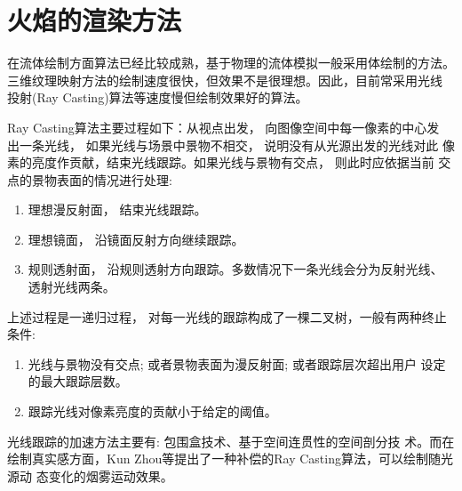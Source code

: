 \section{火焰的渲染方法}

在流体绘制方面算法已经比较成熟，基于物理的流体模拟一般采用体绘制的方法。
三维纹理映射方法的绘制速度很快，但效果不是很理想。因此，目前常采用光线
投射(Ray Casting)算法等速度慢但绘制效果好的算法。

Ray Casting算法主要过程如下：从视点出发， 向图像空间中每一像素的中心发
出一条光线， 如果光线与场景中景物不相交， 说明没有从光源出发的光线对此
像素的亮度作贡献，结束光线跟踪。如果光线与景物有交点， 则此时应依据当前
交点的景物表面的情况进行处理:
\begin{enumerate}
\item 理想漫反射面， 结束光线跟踪。
\item 理想镜面， 沿镜面反射方向继续跟踪。
\item 规则透射面， 沿规则透射方向跟踪。多数情况下一条光线会分为反射光线、
  透射光线两条。
\end{enumerate}
上述过程是一递归过程， 对每一光线的跟踪构成了一棵二叉树，一般有两种终止条件:
\begin{enumerate}
\item 光线与景物没有交点; 或者景物表面为漫反射面; 或者跟踪层次超出用户
  设定的最大跟踪层数。
\item 跟踪光线对像素亮度的贡献小于给定的阈值。
\end{enumerate}

光线跟踪的加速方法主要有: 包围盒技术、基于空间连贯性的空间剖分技
术\cite{review:Wangxiaohua}。而在绘制真实感方面，Kun
Zhou等\cite{Zhou:2008}提出了一种补偿的Ray Casting算法，可以绘制随光源动
态变化的烟雾运动效果。

